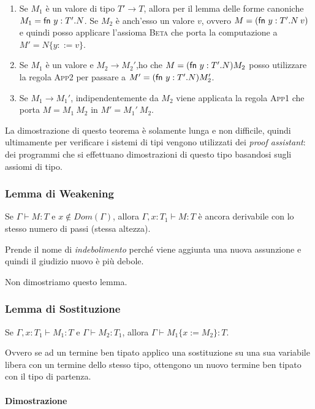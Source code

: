 \begin{itemize}
	\begin{enumerate}[a]
		\item Se $M_1$ è un valore di tipo $T' \rightarrow T$, allora per il lemma delle forme canoniche $M_1 = \fn y:T'.N$. Se $M_2$ è anch'esso un valore $v$, ovvero $M = (\fn y:T'.N \: v)$ e quindi posso applicare l'assioma \textsc{Beta} che porta la computazione a $M' = N\{y ::= v\}$.
		\item Se $M_1$ è un valore e $M_2 \rightarrow M_2'$,ho che $M = (\fn y:T'.N) M_2$ posso utilizzare la regola \textsc{App2} per passare a $M' = (\fn y:T'.N) M_2'$.
		\item Se $M_1 \rightarrow M_1'$, indipendentemente da $M_2$ viene applicata la regola \textsc{App1} che porta $M = M_1 \: M_2 $ in $M' = M_1' \: M_2$. 
	\end{enumerate}
\end{itemize}

\noindent La dimostrazione di questo teorema è solamente lunga e non difficile, quindi ultimamente per verificare i sistemi di tipi vengono utilizzati dei \textit{proof assistant}: dei programmi che si effettuano dimostrazioni di questo tipo basandosi sugli assiomi di tipo.

\subsubsection{Lemma di Weakening}

Se $\Gamma \vdash M : T $ e $x \notin Dom(\Gamma)$, allora $\Gamma, x : T_1 \vdash M : T$ è ancora derivabile con lo stesso numero di passi (stessa altezza).

Prende il nome di \textit{indebolimento} perché viene aggiunta una nuova assunzione e quindi il giudizio nuovo è più debole.

Non dimostriamo questo lemma.

\subsubsection{Lemma di Sostituzione}

Se $\Gamma, x: T_1 \vdash M_1 : T$ e $\Gamma \vdash M_2 : T_1$, allora $\Gamma \vdash M_1\{x := M_2\}: T$.

Ovvero se ad un termine ben tipato applico una sostituzione su una sua variabile libera con un termine dello stesso tipo, ottengono un nuovo termine ben tipato con il tipo di partenza.

\paragraph{Dimostrazione}

